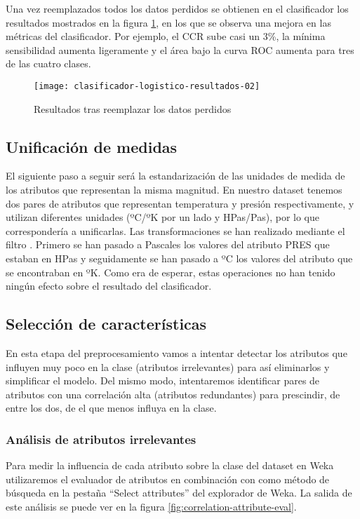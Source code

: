 Una vez reemplazados todos los datos perdidos se obtienen en el clasificador los resultados mostrados en la figura \ref{fig:clasificador-logistico-resultados-02b}, en los que se observa una mejora en las métricas del clasificador. Por ejemplo, el CCR sube casi un 3\%, la mínima sensibilidad aumenta ligeramente y el área bajo la curva ROC aumenta para tres de las cuatro clases.

\begin{figure}[ht]
    \centering
    \texttt{[image: clasificador-logistico-resultados-02]}
    \caption{Resultados tras reemplazar los datos perdidos}
    \label{fig:clasificador-logistico-resultados-02b}
\end{figure}

\subsection{Unificación de medidas}
El siguiente paso a seguir será la estandarización de las unidades de medida de los atributos que representan la misma magnitud. En nuestro dataset tenemos dos pares de atributos que representan temperatura y presión respectivamente, y utilizan diferentes unidades (ºC/ºK por un lado y HPas/Pas), por lo que correspondería a unificarlas. Las transformaciones se han realizado mediante el filtro . Primero se han pasado a Pascales los valores del atributo PRES que estaban en HPas y seguidamente se han pasado a ºC los valores del atributo  que se encontraban en ºK. Como era de esperar, estas operaciones no han tenido ningún efecto sobre el resultado del clasificador.

\subsection{Selección de características}
En esta etapa del preprocesamiento vamos a intentar detectar los atributos que influyen muy poco en la clase (atributos irrelevantes) para así eliminarlos y simplificar el modelo. Del mismo modo, intentaremos identificar pares de atributos con una correlación alta (atributos redundantes) para prescindir, de entre los dos, de el que menos influya en la clase.

\subsubsection{Análisis de atributos irrelevantes}
Para medir la influencia de cada atributo sobre la clase del dataset en Weka utilizaremos el evaluador de atributos  en combinación con  como método de búsqueda en la pestaña ``Select attributes'' del explorador de Weka. La salida de este análisis se puede ver en la figura \ref{fig:correlation-attribute-eval}.


